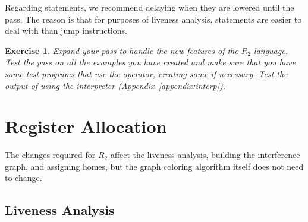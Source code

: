 \documentclass[11pt]{book}
\newtheorem{exercise}[theorem]{Exercise}
\begin{document}
%
%

Regarding  statements, we recommend delaying when they are
lowered until the  pass.  The reason is that
for purposes of liveness analysis,  statements are easier to
deal with than jump instructions.

\begin{exercise}\normalfont
Expand your  pass to handle the new features
of the $R_2$ language. Test the pass on all the examples you have
created and make sure that you have some test programs that use the
 operator, creating some if necessary. Test the output of
 using the  interpreter
(Appendix~\ref{appendix:interp}).
\end{exercise}

\section{Register Allocation}
\label{sec:register-allocation-r2}

The changes required for $R_2$ affect the liveness analysis, building
the interference graph, and assigning homes, but the graph coloring
algorithm itself does not need to change.

\subsection{Liveness Analysis}
\label{sec:liveness-analysis-r2}
\end{document}
